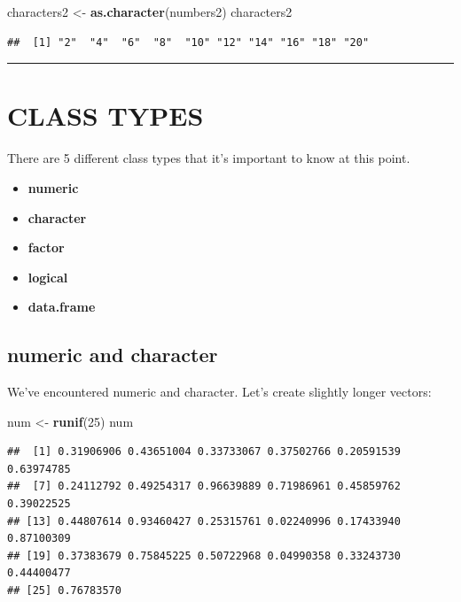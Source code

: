 \documentclass[
]{book}
\newenvironment{Shaded}{\begin{snugshade}}{\end{snugshade}}
\newcommand{\DecValTok}[1]{\textcolor[rgb]{0.00,0.00,0.81}{#1}}
\newcommand{\KeywordTok}[1]{\textcolor[rgb]{0.13,0.29,0.53}{\textbf{#1}}}
\newcommand{\NormalTok}[1]{#1}
\newcommand{\StringTok}[1]{\textcolor[rgb]{0.31,0.60,0.02}{#1}}
\providecommand{\tightlist}{%
  \setlength{\itemsep}{0pt}\setlength{\parskip}{0pt}}
\begin{document}
\begin{Shaded}
\begin{Highlighting}[]
\NormalTok{characters2 <-}\StringTok{ }\KeywordTok{as.character}\NormalTok{(numbers2)}
\NormalTok{characters2}
\end{Highlighting}
\end{Shaded}

\begin{verbatim}
##  [1] "2"  "4"  "6"  "8"  "10" "12" "14" "16" "18" "20"
\end{verbatim}

\begin{center}\rule{0.5\linewidth}{0.5pt}\end{center}

\hypertarget{class-types}{%
\section{CLASS TYPES}\label{class-types}}

There are 5 different class types that it's important to know at this point.

\begin{itemize}
\tightlist
\item
  \textbf{numeric}
\item
  \textbf{character}
\item
  \textbf{factor}
\item
  \textbf{logical}
\item
  \textbf{data.frame}
\end{itemize}

\hypertarget{numeric-and-character}{%
\subsection{numeric and character}\label{numeric-and-character}}

We've encountered numeric and character. Let's create slightly longer vectors:

\begin{Shaded}
\begin{Highlighting}[]
\NormalTok{num <-}\StringTok{ }\KeywordTok{runif}\NormalTok{(}\DecValTok{25}\NormalTok{)}
\NormalTok{num}
\end{Highlighting}
\end{Shaded}

\begin{verbatim}
##  [1] 0.31906906 0.43651004 0.33733067 0.37502766 0.20591539 0.63974785
##  [7] 0.24112792 0.49254317 0.96639889 0.71986961 0.45859762 0.39022525
## [13] 0.44807614 0.93460427 0.25315761 0.02240996 0.17433940 0.87100309
## [19] 0.37383679 0.75845225 0.50722968 0.04990358 0.33243730 0.44400477
## [25] 0.76783570
\end{verbatim}
\end{document}
